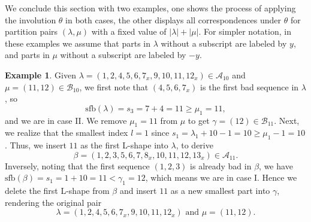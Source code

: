 \documentclass[11pt,reqno]{amsart}
\numberwithin{equation}{section}
\theoremstyle{plain}
\theoremstyle{definition}
\newtheorem{example}[theorem]{Example}
\newcommand{\abs}[1]{\left|#1\right|}
\def\A{\mathcal{A}}
\def\la{\lambda}
\def\sfb{\mathrm{sfb}}
\def\gam{\gamma}
\newcommand{\B}{\mathcal{B}}
\begin{document}
We conclude this section with two examples, one shows the process of applying the involution $\theta$ in both cases, the other displays all correspondences under $\theta$ for partition pairs $(\la,\mu)$ with a fixed value of $\abs{\la}+\abs{\mu}$. For simpler notation, in these examples we assume that parts in $\la$ without a subscript are labeled by $y$, and parts in $\mu$ without a subscript are labeled by $-y$.

\begin{example}
Given $\la=(1, 2, 4, 5, 6, 7_{x}, 9, 10, 11, 12_{x})\in\A_{10}$ and $\mu=(11, 12)\in\B_{10}$, we first note that $(4,5,6,7_x)$ is the first bad sequence in $\la$, so
$$
\sfb(\la)=s_{3}=7+4=11\geq \mu_{1}=11,
$$
and we are in case II. We remove $\mu_1=11$ from $\mu$ to get $\gam=(12)\in\B_{11}$. Next, we realize that the smallest index $l=1$ since $s_1=\la_1+10-1=10\ge \mu_1-1=10$. Thus, we insert $11$ as the first L-shape into $\la$, to derive
$$
\beta=(1, 2, 3, 5, 6, 7, 8_{x}, 10, 11, 12, 13_{x})\in\A_{11}.
$$
Inversely, noting that the first sequence $(1,2,3)$ is already bad in $\beta$, we have $\sfb(\beta)=s_1=1+10=11<\gam_1=12$, which means we are in case I. Hence we delete the first L-shape from $\beta$ and insert $11$ as a new smallest part into $\gam$, rendering the original pair
$$
\la=(1, 2, 4, 5, 6, 7_{x}, 9, 10, 11, 12_{x})\text{ and }\mu=(11, 12).
$$
\end{example}
\end{document}
